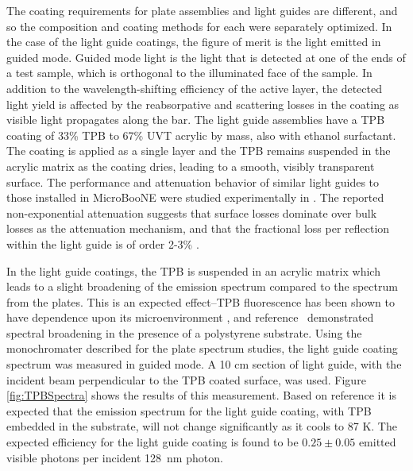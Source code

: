 The coating requirements for plate assemblies and light guides are different, and so the composition and coating methods for each were separately optimized.    In the case of the light guide coatings, the figure of merit is the light emitted in guided mode.  Guided mode light is the light that is detected at one of the ends of a test sample, which is orthogonal to the illuminated face of the sample.  In addition to the wavelength-shifting efficiency of the active layer, the detected light yield is affected by the reabsorpative and scattering losses in the coating as visible light propagates along the bar. The light guide assemblies have a TPB coating of 33\% TPB to 67\% UVT acrylic by mass, also with ethanol surfactant. The coating is applied as a single layer and the TPB remains suspended in the acrylic matrix as the coating dries, leading to a smooth, visibly transparent surface.  The performance and attenuation behavior of similar light guides to those installed in MicroBooNE were studied experimentally in \cite{Baptista:2012}.  The reported non-exponential attenuation suggests that surface losses dominate over bulk losses as the attenuation mechanism, and that the fractional loss per reflection within the light guide is of order 2-3\% \cite{Jones:2013}. 

In the light guide coatings, the TPB is suspended in an acrylic matrix which leads to a slight broadening of the emission spectrum compared to the spectrum from the plates. This is an expected effect--TPB fluorescence has been shown to have dependence upon its microenvironment \cite{Birks:1959,Birks:1961,Francini:2013-jinst,Hanagodimath:2008, Liu:1997}, and reference~\cite{Francini:2013-jinst} demonstrated spectral broadening in the presence of a polystyrene substrate.  Using the monochromater described for the plate spectrum studies, the light guide coating spectrum was measured in guided mode. A 10 cm section of light guide, with the incident beam perpendicular to the TPB coated surface, was used.  Figure \ref{fig:TPBSpectra} shows the results of this measurement.  Based on reference \cite{Francini:2013-jinst} it is expected that the emission spectrum for the light guide coating, with TPB embedded in the substrate, will not change significantly as it cools to 87 K.  The expected efficiency for the light guide coating is found to be $0.25 \pm 0.05$ emitted visible photons per incident 128~nm photon.

